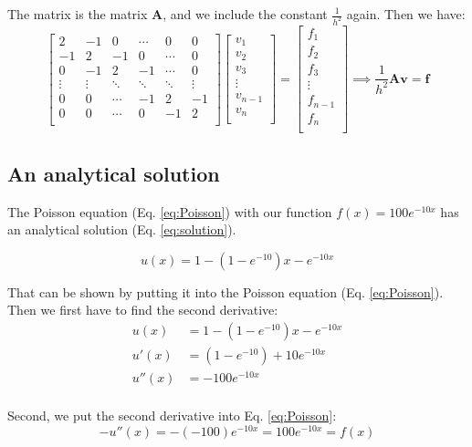 The matrix is the matrix $\textbf{A}$, and we include the constant $\frac{1}{h^2}$ again. Then we have:
\[
    \begin{bmatrix}
    	2& -1& 0 &\cdots & 0 &0 \\
        -1 & 2 & -1 &0 &\cdots &0 \\
        0&-1 &2 & -1 & \cdots & 0 \\
        \vdots& \vdots & \ddots &\ddots &\ddots & \vdots \\
        0&0 & \cdots &-1 &2& -1 \\
        0&0 & \cdots & 0  &-1 & 2 \\
        \end{bmatrix}
\begin{bmatrix}
	v_1\\
	v_2\\
	v_3\\
	\vdots\\
	v_{n-1}\\
	v_{n}\\
\end{bmatrix}=
\begin{bmatrix}
	f_1\\
	f_2\\
	f_3\\
	\vdots\\
	f_{n-1}\\
	f_{n}\\
\end{bmatrix}
\implies \frac{1}{h^2}\mathbf{A}\mathbf{v}=\mathbf{f}
\]

\subsection{An analytical solution}

The Poisson equation (Eq. \ref{eq:Poisson}) with our function $f(x) = 100e^{-10x}$ has an analytical solution (Eq. \ref{eq:solution}).

\begin{equation}\label{eq:solution}
u(x) = 1 - \left(1-e^{-10}\right)x - e^{-10x}
\end{equation}

That can be shown by putting it into the Poisson equation (Eq. \ref{eq:Poisson}). Then we first have to find the second derivative:
\begin{align*}
u(x) &= 1 - \left(1-e^{-10}\right) x - e^{-10x}\\
u'(x) &= \left(1-e^{-10}\right)+ 10 e^{-10x}\\ 
u''(x) &= -100 e^{-10x}\\
\end{align*}

Second, we put the second derivative into Eq. \ref{eq:Poisson}:
\[ -u''(x) = -(-100) e^{-10x
} = 100 e^{-10x} = f(x) \]

